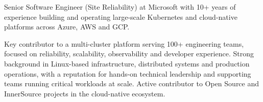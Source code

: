 

\begin{cvparagraph}

Senior Software Engineer (Site Reliability) at Microsoft with 10+ years of experience building and operating large-scale Kubernetes and cloud-native platforms across Azure, AWS and GCP.

 Key contributor to a multi-cluster platform serving 100+ engineering teams, focused on reliability, scalability, observability and developer experience.
 Strong background in Linux-based infrastructure, distributed systems and production operations, with a reputation for hands-on technical leadership and supporting teams running critical workloads at scale.
 Active contributor to Open Source and InnerSource projects in the cloud-native ecosystem.
\end{cvparagraph}
